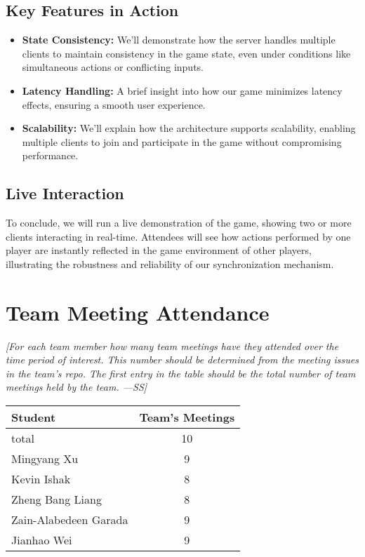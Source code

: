 \documentclass[12pt]{article}
\begin{document}
\subsection{Key Features in Action}
\begin{itemize}
    \item \textbf{State Consistency:} We'll demonstrate how the server handles multiple clients to maintain consistency in the game state, even under conditions like simultaneous actions or conflicting inputs.
    \item \textbf{Latency Handling:} A brief insight into how our game minimizes latency effects, ensuring a smooth user experience.
    \item \textbf{Scalability:} We'll explain how the architecture supports scalability, enabling multiple clients to join and participate in the game without compromising performance.
\end{itemize}

\subsection{Live Interaction}
To conclude, we will run a live demonstration of the game, showing two or more clients interacting in real-time. Attendees will see how actions performed by one player are instantly reflected in the game environment of other players, illustrating the robustness and reliability of our synchronization mechanism.


\section{Team Meeting Attendance}
\textit{[For each team member how many team meetings have they attended over the time period of interest. This number should be determined from the meeting issues in the team’s repo. The first entry in the table should be the total number of team meetings held by the team. ---SS]}

\begin{longtable}{|l|c|}
\hline
\textbf{Student} & \textbf{Team's Meetings} \\
\hline
total & 10 \\
Mingyang Xu & 9 \\
Kevin Ishak & 8 \\
Zheng Bang Liang & 8 \\
Zain-Alabedeen Garada & 9 \\
Jianhao Wei & 9 \\
\hline
\end{longtable}
\end{document}

